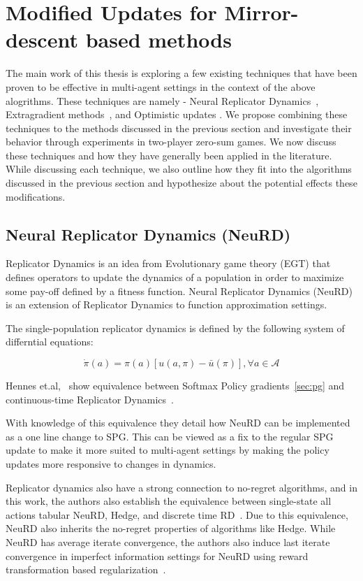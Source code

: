 \chapter{Modified Updates for Mirror-descent based methods}

The main work of this thesis is exploring a few existing techniques that have been proven to be 
effective in multi-agent settings in the context of the above alogrithms.
These techniques are namely - Neural Replicator Dynamics~\cite{hennesNeural2020}, Extragradient methods~\cite{korpelevichextragradient1976}, and Optimistic updates \red{[?]}. 
We propose combining these techniques to the methods discussed in the previous section and
investigate their behavior through experiments in two-player zero-sum games.
We now discuss these techniques and how they have generally been applied in the literature. 
While discussing each technique, we also outline how they fit into the algorithms discussed 
in the previous section and hypothesize about the potential effects these modifications.

\section{Neural Replicator Dynamics (NeuRD)}
Replicator Dynamics is an idea from Evolutionary game theory (EGT) that defines operators to update
the dynamics of a population in order to maximize some pay-off defined by a fitness function.
Neural Replicator Dynamics (NeuRD) is an extension of Replicator Dynamics 
to function approximation settings.

The single-population replicator dynamics is defined by the following system of differntial
equations:

\begin{equation}
	\label{eqn:rd} \dot{\pi}(a) = \pi(a)[u(a, \pi) -
		\bar{u}(\pi)], \forall a \in \mathcal{A}
\end{equation}

Hennes et.al,~\cite{hennesNeural2020} show equivalence between Softmax Policy gradients~\ref{sec:pg} and
continuous-time Replicator Dynamics~\cite[THEOREM 1, on p5]{hennesNeural2020}\label{thm:spgrd}.

With knowledge of this equivalence they detail how NeuRD can be implemented as a one line change to SPG.
This can be viewed as a fix to the regular SPG update to make it more suited to multi-agent settings 
by making the policy updates more responsive to changes in dynamics.

Replicator dynamics also have a strong connection to no-regret algorithms, and in this work, the authors also establish 
the equivalence between single-state all actions tabular NeuRD, Hedge, and discrete time RD~\cite[Statement 1, p5]{hennesNeural2020}.
Due to this equivalence, NeuRD also inherits the no-regret properties of algorithms like Hedge.
While NeuRD has average iterate convergence, the authors also induce last iterate convergence in imperfect 
information settings for NeuRD using reward transformation based regularization~\cite{perolatPoincare2021}.

